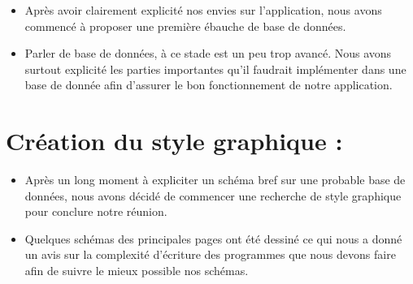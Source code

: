 \documentclass{article}
\begin{document}
\begin{itemize}
\item \Large Après avoir clairement explicité nos envies sur l’application, nous avons commencé à proposer une première ébauche de base de données.

\item \Large Parler de base de données, à ce stade est un peu trop avancé. Nous avons surtout explicité les parties importantes qu’il faudrait implémenter dans une base de donnée afin d’assurer le bon fonctionnement de notre application.
\end{itemize}

\section{\huge Création du style graphique :}

\begin{itemize}
\item \Large Après un long moment à expliciter un schéma bref sur une probable base de données, nous avons décidé de commencer une recherche de style graphique pour conclure notre réunion.

\item \Large Quelques schémas des principales pages ont été dessiné ce qui nous a donné un avis sur la complexité d’écriture des programmes que nous devons faire afin de suivre le mieux possible nos schémas.
\end{itemize}
\end{document}
